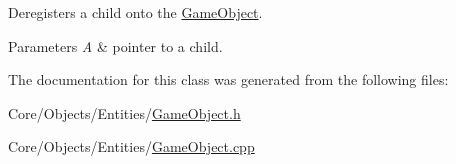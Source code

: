 Deregisters a child onto the \hyperlink{classDCEngine_1_1GameObject}{Game\-Object}. 


\begin{DoxyParams}{Parameters}
{\em A} & pointer to a child. \\
\hline
\end{DoxyParams}


The documentation for this class was generated from the following files\-:\begin{DoxyCompactItemize}
\item 
Core/\-Objects/\-Entities/\hyperlink{GameObject_8h}{Game\-Object.\-h}\item 
Core/\-Objects/\-Entities/\hyperlink{GameObject_8cpp}{Game\-Object.\-cpp}\end{DoxyCompactItemize}
